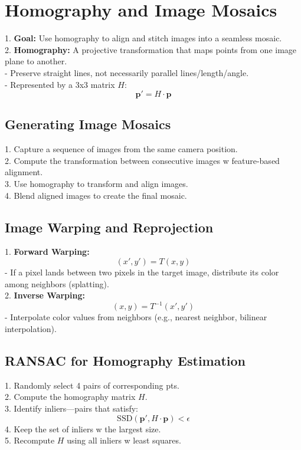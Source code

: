 \section{Homography and Image Mosaics}
1. \textbf{Goal:} Use homography to align and stitch images into a seamless mosaic. \\
2. \textbf{Homography:} A projective transformation that maps points from one image plane to another. \\
   - Preserve straight lines, not necessarily parallel lines/length/angle. \\
   - Represented by a 3x3 matrix \(H\):
   \[
   \mathbf{p'} = H \cdot \mathbf{p}
   \]

\subsection*{Generating Image Mosaics}
1. Capture a sequence of images from the same camera position. \\
2. Compute the transformation between consecutive images w feature-based alignment. \\
3. Use homography to transform and align images. \\
4. Blend aligned images to create the final mosaic. \\

\subsection*{Image Warping and Reprojection}
1. \textbf{Forward Warping:} 
   \[
   (x', y') = T(x, y)
   \]
   - If a pixel lands between two pixels in the target image, distribute its color among neighbors (splatting). \\
2. \textbf{Inverse Warping:} 
   \[
   (x, y) = T^{-1}(x', y')
   \]
   - Interpolate color values from neighbors (e.g., nearest neighbor, bilinear interpolation).

\subsection*{RANSAC for Homography Estimation}
1. Randomly select 4 pairs of corresponding pts. \\
2. Compute the homography matrix \(H\). \\
3. Identify inliers—pairs that satisfy:
   \[
   \text{SSD}(\mathbf{p'}, H \cdot \mathbf{p}) < \epsilon
   \]
4. Keep the set of inliers w the largest size. \\
5. Recompute \(H\) using all inliers w least squares.

